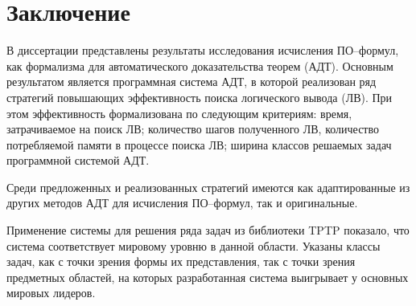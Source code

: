 \chapter*{Заключение}

В диссертации представлены результаты исследования исчисления ПО--формул, как формализма для автоматического доказательства теорем (АДТ). Основным результатом является программная система АДТ, в которой реализован ряд стратегий повышающих эффективность поиска логического вывода (ЛВ). При этом эффективность формализована по следующим критериям: время, затрачиваемое на поиск ЛВ; количество шагов полученного ЛВ, количество потребляемой памяти в процессе поиска ЛВ; ширина классов решаемых задач программной системой АДТ.

Среди предложенных и реализованных стратегий имеются как адаптированные из других методов АДТ для исчисления ПО--формул, так и оригинальные.

Применение системы для решения ряда задач из библиотеки TPTP показало, что система соответствует мировому уровню в данной области. Указаны классы задач, как с точки зрения формы их представления, так с точки зрения предметных областей, на которых разработанная система выигрывает у основных мировых лидеров. %



